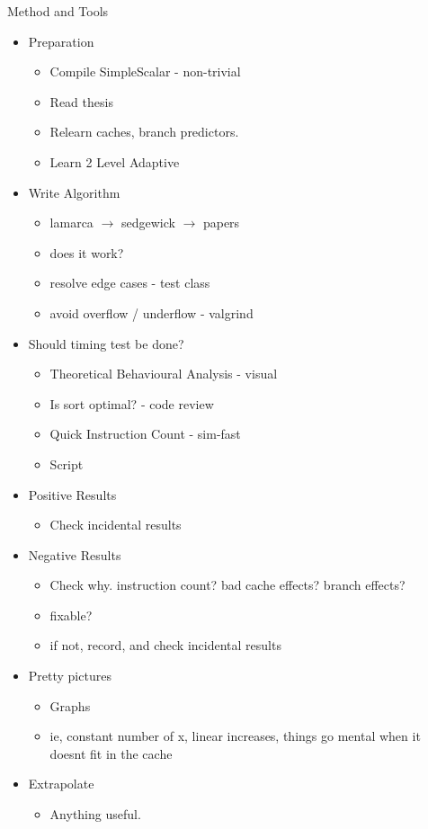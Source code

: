 \begin{slide}


\begin{stitle}
Method and Tools
\end{stitle}

\begin{itemize}
\item Preparation
\begin{itemize}
\item Compile SimpleScalar - non-trivial
\item Read thesis
\item Relearn caches, branch predictors.
\item Learn 2 Level Adaptive
\end{itemize}

\item Write Algorithm
\begin{itemize}
\item lamarca $\rightarrow$ sedgewick $\rightarrow$ papers
\item does it work?
\item resolve edge cases - test class
\item avoid overflow / underflow - valgrind
\end{itemize}
\pagebreak
\item Should timing test be done?
\begin{itemize}
\item Theoretical Behavioural Analysis - visual
\item Is sort optimal? - code review
\item Quick Instruction Count - sim-fast
\item Script
\end{itemize}

\item Positive Results
\begin{itemize}
\item Check incidental results
\end{itemize}

\item  Negative Results
\begin{itemize}
\item Check why. instruction count? bad cache effects? branch effects?
\item fixable?
\item if not, record, and check incidental results
\end{itemize}

\pagebreak
\item Pretty pictures
\begin{itemize}
\item Graphs
\item ie, constant number of x, linear increases, things go mental when it doesnt fit in the cache
\end{itemize}

\item Extrapolate
\begin{itemize}
\item Anything useful.
\end{itemize}

\end{itemize}

\end{slide}

